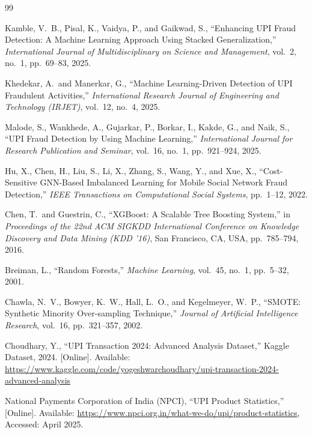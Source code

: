 \renewcommand{\bibname}{References}

\begin{thebibliography}{99}

Kamble, V.\ B., Pisal, K., Vaidya, P., and Gaikwad, S.,
``Enhancing UPI Fraud Detection: A Machine Learning Approach Using Stacked Generalization,''
\textit{International Journal of Multidisciplinary on Science and Management},
vol.\ 2, no.\ 1, pp.\ 69--83, 2025.

Khedekar, A.\ and Manerkar, G.,
``Machine Learning-Driven Detection of UPI Fraudulent Activities,''
\textit{International Research Journal of Engineering and Technology (IRJET)},
vol.\ 12, no.\ 4, 2025.

Malode, S., Wankhede, A., Gujarkar, P., Borkar, I., Kakde, G., and Naik, S.,
``UPI Fraud Detection by Using Machine Learning,''
\textit{International Journal for Research Publication and Seminar},
vol.\ 16, no.\ 1, pp.\ 921--924, 2025.

Hu, X., Chen, H., Liu, S., Li, X., Zhang, S., Wang, Y., and Xue, X.,
``Cost-Sensitive GNN-Based Imbalanced Learning for Mobile Social Network Fraud Detection,''
\textit{IEEE Transactions on Computational Social Systems},
pp.\ 1--12, 2022.

Chen, T.\ and Guestrin, C.,
``XGBoost: A Scalable Tree Boosting System,''
in \textit{Proceedings of the 22nd ACM SIGKDD International Conference on Knowledge Discovery and Data Mining (KDD '16)},
San Francisco, CA, USA, pp.\ 785--794, 2016.

Breiman, L.,
``Random Forests,''
\textit{Machine Learning},
vol.\ 45, no.\ 1, pp.\ 5--32, 2001.

Chawla, N.\ V., Bowyer, K.\ W., Hall, L.\ O., and Kegelmeyer, W.\ P.,
``SMOTE: Synthetic Minority Over-sampling Technique,''
\textit{Journal of Artificial Intelligence Research},
vol.\ 16, pp.\ 321--357, 2002.

Choudhary, Y.,
``UPI Transaction 2024: Advanced Analysis Dataset,''
Kaggle Dataset, 2024. [Online]. Available:
\url{https://www.kaggle.com/code/yogeshwarchoudhary/upi-transaction-2024-advanced-analysis}

National Payments Corporation of India (NPCI),
``UPI Product Statistics,''
[Online]. Available: \url{https://www.npci.org.in/what-we-do/upi/product-statistics},
Accessed: April 2025.


\end{thebibliography}
